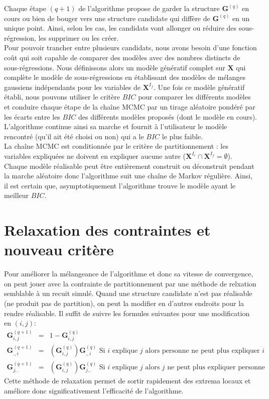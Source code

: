 \documentclass[12pt,a4paper]{report}
\begin{document}
		Chaque étape $(q+1)$ de l'algorithme propose de garder la structure $\boldsymbol{G}^{(q)}$ en cours ou bien de bouger vers une structure candidate qui diffère de $\boldsymbol{G}^{(q)}$ en un unique point. Ainsi, selon les cas, les candidats vont allonger ou réduire des sous-régression, les supprimer ou les créer. \\
		Pour pouvoir trancher entre plusieurs candidats, nous avons besoin d'une fonction coût qui soit capable de comparer des modèles avec des nombres distincts de sous-régressions. Nous définissons alors un modèle génératif complet sur $\boldsymbol{X}$ qui complète le modèle de sous-régressions en établissant des modèles de mélanges gaussiens indépendants pour les variables de $\boldsymbol{X}^{I_f}$. Une fois ce modèle génératif établi, nous pouvons utiliser le critère $BIC$ pour comparer les différents modèles et conduire chaque étape de la chaîne MCMC par un tirage aléatoire pondéré par les écarts entre les $BIC$ des différents modèles proposés (dont le modèle en cours). L'algorithme continue ainsi sa marche et fournit à l'utilisateur le modèle rencontré (qu'il ait été choisi ou non) qui a le $BIC$ le plus faible. \\
		La chaîne MCMC est conditionnée par le critère de partitionnement : les variables expliquées ne doivent en expliquer aucune autre ($\boldsymbol{X}^{I_r}\cap \boldsymbol{X}^{I_f}=\emptyset$). Chaque modèle réalisable peut être entièrement construit ou déconstruit pendant la marche aléatoire donc l'algorithme suit une chaîne de Markov régulière. Ainsi, il est certain que, asymptotiquement l'algorithme trouve le modèle ayant le meilleur $BIC$.
	\section{Relaxation des contraintes et nouveau critère}
		Pour améliorer la mélangeance de l'algorithme et donc sa vitesse de convergence, on peut jouer avec la contrainte de partitionnement par une méthode de relxation semblable à un recuit simulé. Quand une structure candidate n'est pas réalisable (ne produit pas de partition), on peut la modifier en d'autres endroits pour la rendre réalisable. Il suffit de suivre les formules suivantes pour une modification en $(i,j)$:
		\begin{eqnarray}
			\boldsymbol{G}_{i,j}^{(q+1)}&=&1-\boldsymbol{G}_{i,j}^{(q)} \\
			\boldsymbol{G}_{.,i}^{(q+1)}&=& (\boldsymbol{G}_{i,j}^{(q)})\boldsymbol{G}_{.,i}^{(q)} \textrm{ Si $i$ explique $j$ alors personne ne peut plus expliquer $i$} \\
			\boldsymbol{G}_{j,.}^{(q+1)}&=&(\boldsymbol{G}_{i,j}^{(q)})\boldsymbol{G}_{j,.}^{(q)} \textrm{ Si $i$ explique $j$ alors $j$ ne peut plus expliquer personne}
		\end{eqnarray}
		Cette méthode de relaxation permet de sortir rapidement des extrema locaux et améliore donc significativement l'efficacité de l'algorithme.\\
		 
\end{document}
